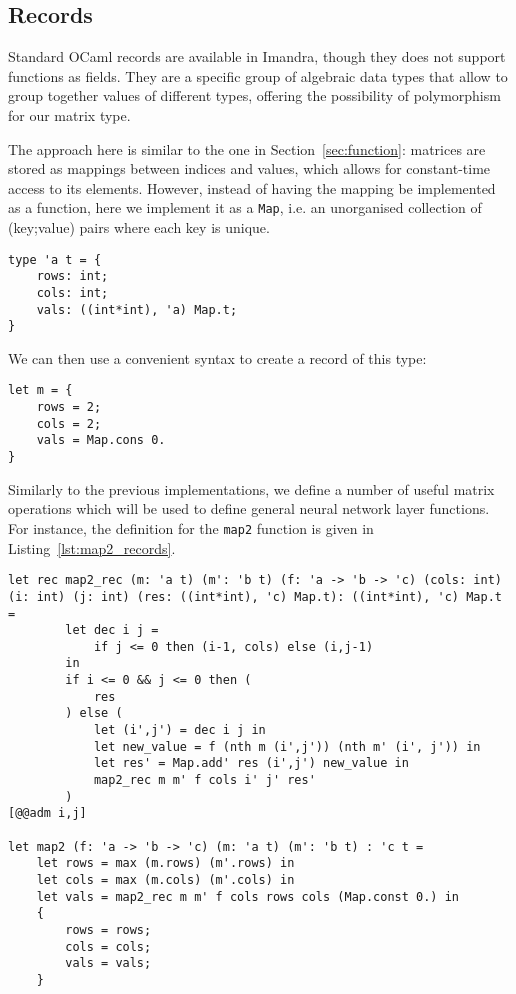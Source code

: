 \documentclass[runningheads]{llncs}
\begin{document}
\subsection{Records}

Standard OCaml records are available in Imandra, though they does not support functions as fields. They are a specific group of algebraic data types that allow to group together values of different types, offering the possibility of polymorphism for our matrix type. 

The approach here is similar to the one in Section~\ref{sec:function}: matrices are stored as mappings between indices and values, which allows for constant-time access to its elements. However, instead of having the mapping be implemented as a function, here we implement it as a \lstinline{Map}, i.e. an unorganised collection of (key;value) pairs where each key is unique. 

\begin{lstlisting}[language=caml]
type 'a t = {
	rows: int;
	cols: int;
	vals: ((int*int), 'a) Map.t;
}
\end{lstlisting}

We can then use a convenient syntax to create a record of this type:

\begin{lstlisting}[language=caml]
let m = {
	rows = 2;
	cols = 2;
	vals = Map.cons 0.
}
\end{lstlisting}

Similarly to the previous implementations, we define a number of useful matrix operations which will be used to define general neural network layer functions. For instance, the definition for the \lstinline{map2} function is given in Listing~\ref{lst:map2_records}.

\begin{lstlisting}[language=caml, label={lst:map2_records}, caption=Map2 implementation]
let rec map2_rec (m: 'a t) (m': 'b t) (f: 'a -> 'b -> 'c) (cols: int) (i: int) (j: int) (res: ((int*int), 'c) Map.t): ((int*int), 'c) Map.t =
		let dec i j = 
			if j <= 0 then (i-1, cols) else (i,j-1)     
		in
		if i <= 0 && j <= 0 then (
			res
		) else (
			let (i',j') = dec i j in
			let new_value = f (nth m (i',j')) (nth m' (i', j')) in
			let res' = Map.add' res (i',j') new_value in
			map2_rec m m' f cols i' j' res'
		)
[@@adm i,j]

let map2 (f: 'a -> 'b -> 'c) (m: 'a t) (m': 'b t) : 'c t = 
	let rows = max (m.rows) (m'.rows) in
	let cols = max (m.cols) (m'.cols) in
	let vals = map2_rec m m' f cols rows cols (Map.const 0.) in
	{
		rows = rows;
		cols = cols;
		vals = vals;
	}
\end{lstlisting} 
\end{document}

